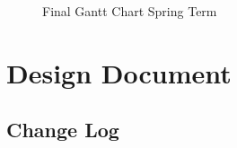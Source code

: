 \documentclass[onecolumn, draftclsnofoot,10pt, compsoc]{IEEEtran}
\begin{document}
\begin{figure}[htp] 
\caption{Final Gantt Chart Spring Term}
\end{figure}

 \section{Design Document}
 \subsection{Change Log}
\end{document}
